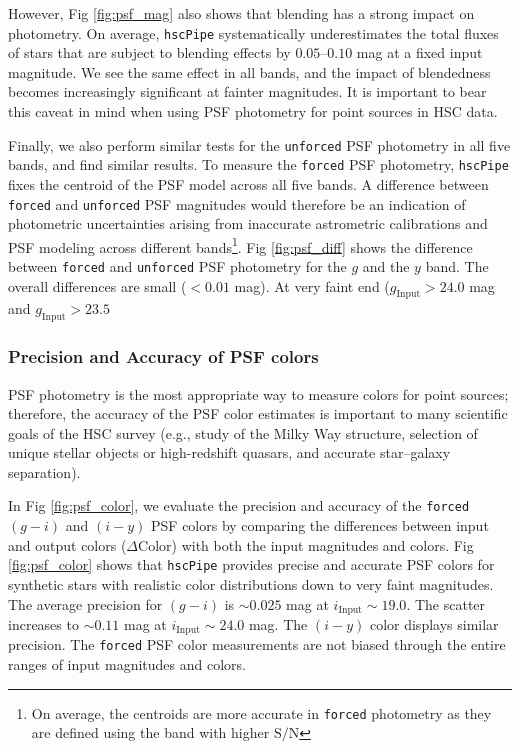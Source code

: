 \documentclass[useamsfonts]{pasj01}
\def\hscpipe{\texttt{hscPipe}}
\def\forced{\texttt{forced}}
\def\unforced{\texttt{unforced}}
\def\s2n{{$\mathrm{S}/\mathrm{N}$}}
\begin{document}
	However, Fig \ref{fig:psf_mag} also shows that blending has a strong impact on 
	photometry.  
	On average, \hscpipe{} systematically underestimates the total fluxes of stars 
	that are subject to blending effects by $0.05$--$0.10$ mag at a fixed input 
	magnitude.
    We see the same effect in all bands, and the impact of blendedness becomes
    increasingly significant at fainter magnitudes.
    It is important to bear this caveat in mind when using PSF photometry for point
    sources in HSC data.

	Finally, we also perform similar tests for the \unforced{} PSF photometry in all 
	five bands, and find similar results. 
	To measure the \forced{} PSF photometry, \hscpipe{} fixes the centroid of the PSF 
	model across all five bands. 
	A difference between \forced{} and \unforced{} PSF magnitudes would therefore be 
	an indication of photometric uncertainties arising from inaccurate astrometric 
	calibrations and PSF modeling across different bands\footnote{On average, the 
	centroids are more accurate in \forced{} photometry as they are defined using 
	the band with higher \s2n{}}. 
	Fig \ref{fig:psf_diff} shows the difference between \forced{} and \unforced{} 
	PSF photometry for the $g$ and the $y$ band. 
	The overall differences are small ($<0.01$ mag). 
	At very faint end ($g_{\mathrm{Input}}>24.0$ mag and $g_{\mathrm{Input}}>23.5$

\subsubsection{Precision and Accuracy of PSF colors}

    PSF photometry is the most appropriate way to measure colors for point
    sources; therefore, the accuracy of the PSF color estimates is important to many 
    scientific goals of the HSC survey
    (e.g., study of the Milky Way structure, selection of unique stellar objects or
    high-redshift quasars, and accurate star--galaxy separation).

    In Fig \ref{fig:psf_color}, we evaluate the precision and accuracy of the 
    \forced{} $(g-i)$ and $(i-y)$ PSF colors by comparing the differences between input 
    and output colors ($\Delta \mathrm{Color}$) with both the input magnitudes and 
    colors. 
    Fig \ref{fig:psf_color} shows that \hscpipe{} provides precise and accurate PSF 
    colors for synthetic stars with realistic color distributions down to very 
    faint magnitudes. 
    The average precision for $(g-i)$ is ${\sim}0.025$ mag at 
    $i_{\mathrm{Input}}{\sim}19.0$. 
    The scatter increases to ${\sim}0.11$ mag at $i_{\mathrm{Input}}{\sim}24.0$ mag.  
    The $(i-y)$ color displays similar precision. 
    The \forced{} PSF color measurements are not biased through the entire ranges of 
    input magnitudes and colors.
    
\end{document}
